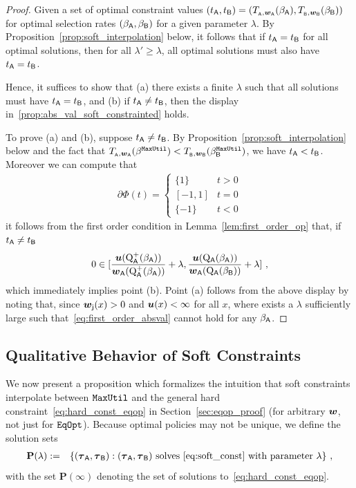 	\begin{proof} Given a set of optimal constraint values $(t_{\mathsf{A}}, t_{\mathsf{B}}) = (T_{_{\mathsf{A}},\boldsymbol{w}_{\mathsf{A}}}(\beta_{\mathsf{A}}),T_{_{\mathsf{B}},\boldsymbol{w}_{\mathsf{B}}}(\beta_{\mathsf{B}}))$ for optimal selection rates $(\beta_{\mathsf{A}},\beta_{\mathsf{B}})$ for a given parameter $\lambda$. By Proposition~\ref{prop:soft_interpolation} below, it follows that if $t_{\mathsf{A}} = t_{\mathsf{B}}$ for all optimal solutions, then for all $\lambda' \ge \lambda$, all optimal solutions must also have $t_{\mathsf{A}} = t_{\mathsf{B}}$. 

	Hence, it suffices to show that (a) there exists a finite $\lambda$ such that all solutions must have $t_{\mathsf{A}} = t_{\mathsf{B}}$, and (b) if $t_{\mathsf{A}} \ne t_{\mathsf{B}}$, then the display in~\eqref{prop:abs_val_soft_constrainted} holds. 

	To prove (a) and (b), suppose $t_{\mathsf{A}} \ne t_{\mathsf{B}}$. By Proposition~\ref{prop:soft_interpolation} below and the fact that $T_{_{\mathsf{A}},\boldsymbol{w}_{\mathsf{A}}}(\beta^{\mathtt{MaxUtil}}) < T_{_{\mathsf{B}},\boldsymbol{w}_{\mathsf{B}}}(\beta_{\mathsf{B}}^{\mathtt{MaxUtil}})$, we have $t_{\mathsf{A}} < t_{\mathsf{B}}$. Moreover we can compute that
	\begin{eqnarray*}
	\partial \Phi(t) = \begin{cases} \{1\} & t > 0\\
	[-1,1] & t = 0 \\
	\{-1\} & t < 0 \end{cases}
	\end{eqnarray*}
	it follows from the first order condition in Lemma~\ref{lem:first_order_op} that, if $t_{\mathsf{A}} \ne t_{\mathsf{B}}$
	\begin{eqnarray}\label{eq:first_order_absval}
	0 \in [ \frac{\boldsymbol{u}(\mathrm{Q}^+_{\mathsf{A}}(\beta_{\mathsf{A}}))}{\boldsymbol{w}_{\mathsf{A}}(\mathrm{Q}^+_{\mathsf{A}}(\beta_{\mathsf{A}}))} + \lambda  , \frac{\boldsymbol{u}(\mathrm{Q}_{\mathsf{A}}(\beta_{\mathsf{A}}))}{\boldsymbol{w}_{\mathsf{A}}(\mathrm{Q}_{\mathsf{A}}(\beta_{\mathsf{B}}))}  + \lambda ]~,
	\end{eqnarray}
	which immediately implies point (b). Point (a) follows from the above display by noting that, since $\boldsymbol{w}_{\mathsf{j}}(x) > 0$ and $\boldsymbol{u}(x) < \infty$ for all $x$, where exists a $\lambda$ sufficiently large such that~\eqref{eq:first_order_absval} cannot hold for any $\beta_{\mathsf{A}}$.
	\end{proof}


\subsection{Qualitative Behavior of Soft Constraints}\label{sec:soft_constraints}
	
	We now present a proposition which formalizes the intuition that soft constraints interpolate between $\mathtt{MaxUtil}$ and the general hard constraint~\eqref{eq:hard_const_eqop}  in Section~\ref{sec:eqop_proof} (for arbitrary $\boldsymbol{w}$, not just for $\mathtt{EqOpt}$). Because optimal policies may not be unique, we define the solution sets 
	\begin{eqnarray*}
	\mathbf{P}(\lambda) &:=& \{ (\boldsymbol{\tau}_{\mathsf{A}},\boldsymbol{\tau}_{\mathsf{B}}) : (\boldsymbol{\tau}_{\mathsf{A}},\boldsymbol{\tau}_{\mathsf{B}}) \text{ solves}~\eqref{eq:soft_const} \text{ with parameter } \lambda \}~,
	\end{eqnarray*}
	with the set $\mathbf{P}(\infty)$ denoting the set of solutions to~\eqref{eq:hard_const_eqop}.

